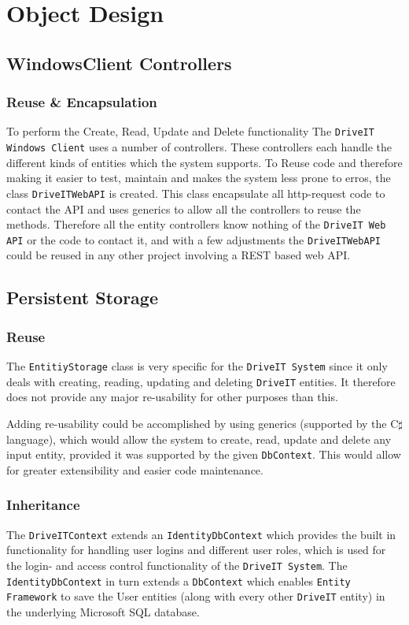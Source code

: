 \section{Object Design}
\subsection{WindowsClient Controllers}
\subsubsection{Reuse \& Encapsulation}
To perform the Create, Read, Update and Delete functionality The \texttt{DriveIT Windows Client} uses a number of controllers. These controllers each handle the different kinds of entities which the system supports. To Reuse code and therefore making it easier to test, maintain and makes the system less prone to erros, the class \texttt{DriveITWebAPI} is created. This class encapsulate all http-request code to contact the API and uses generics to allow all the controllers to reuse the methods. 
Therefore all the entity controllers know nothing of the \texttt{DriveIT Web API} or the code to contact it, and with a few adjustments the \texttt{DriveITWebAPI} could be reused in any other project involving a REST based web API.

\subsection{Persistent Storage}

\subsubsection{Reuse}
The \texttt{EntitiyStorage} class is very specific for the \texttt{DriveIT System} since it only deals with creating, reading, updating and deleting \texttt{DriveIT} entities. It therefore does not provide any major re-usability for other purposes than this. 

Adding re-usability could be accomplished by using generics (supported by the C$\sharp$ language), which would allow the system to create, read, update and delete any input entity, provided it was supported by the given \texttt{DbContext}. This would allow for greater extensibility and easier code maintenance.

\subsubsection{Inheritance}
The \texttt{DriveITContext} extends an \texttt{IdentityDbContext} which provides the built in functionality for handling user logins and different user roles, which is used for the login- and access control functionality of the \texttt{DriveIT System}.
The \texttt{IdentityDbContext} in turn extends a \texttt{DbContext} which enables \texttt{Entity Framework} to save the User entities (along with every other \texttt{DriveIT} entity) in the underlying Microsoft SQL database.

